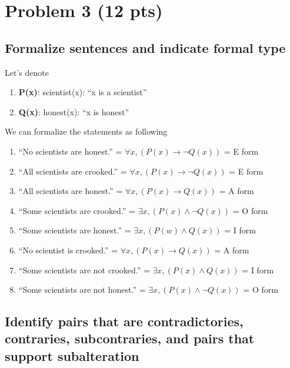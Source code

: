 \newpage

\section{Problem 3 (12 pts)}
\subsection{Formalize sentences and indicate formal type}

Let's denote
\begin{enumerate}
    \item[]\textbf{P(x)}: scientist(x): ``x is a scientist''
    \item[]\textbf{Q(x)}: honest(x): ``x is honest''
\end{enumerate}

We can formalize the statements as following

\begin{enumerate}
    \item ``No scientists are honest.'' = $\forall x, (P(x) \to \neg Q(x))$ = E form

    \item ``All scientists are crooked.'' = $\forall x, (P(x) \to \neg Q(x))$ = E form

    \item ``All scientists are honest.'' = $\forall x, (P(x) \to Q(x))$ = A form

    \item ``Some scientists are crooked.'' = $\exists x, (P(x) \wedge \neg Q(x))$ = O form

    \item ``Some scientists are honest.'' = $\exists x, (P(w) \wedge Q(x))$ = I form

    \item ``No scientist is crooked.'' = $\forall x, (P(x) \to Q(x))$ = A form

    \item ``Some scientists are not crooked.'' = $\exists x, (P(x) \wedge Q(x))$ = I form

    \item ``Some scientists are not honest.'' = $\exists x, (P(x) \wedge \neg Q(x))$ = O form
\end{enumerate}


\subsection{Identify pairs that are contradictories, contraries, subcontraries, and pairs that support subalteration}



